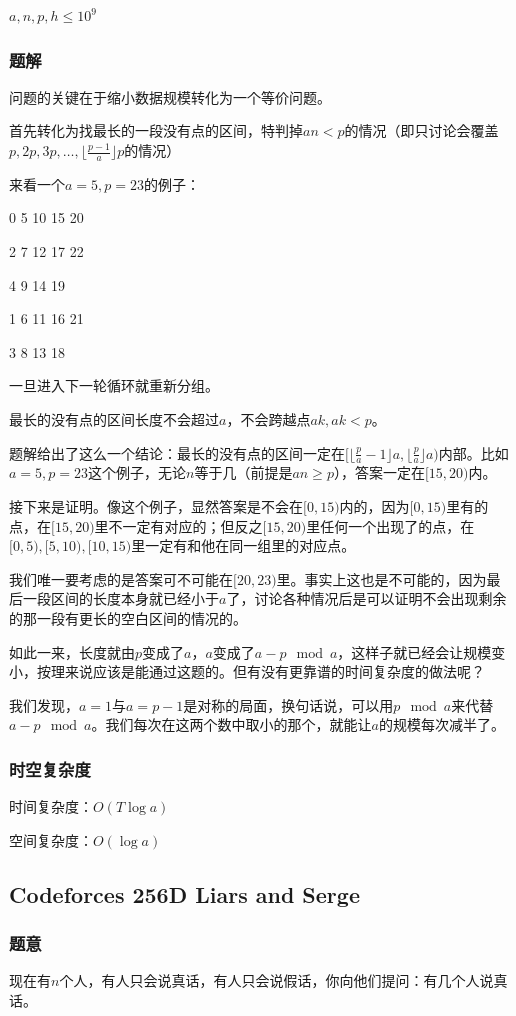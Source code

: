 \documentclass{ctexart}
\begin{document}
$a,n,p,h \le 10^9$
\subsubsection{题解}
问题的关键在于缩小数据规模转化为一个等价问题。

首先转化为找最长的一段没有点的区间，特判掉$an < p$的情况（即只讨论会覆盖$p,2p,3p,\ldots,\lfloor \frac{p-1}{a} \rfloor p$的情况）

来看一个$a=5,p=23$的例子：

0  5  10  15  20

2  7  12  17  22

4  9  14  19

1  6  11  16  21

3  8  13  18

一旦进入下一轮循环就重新分组。

最长的没有点的区间长度不会超过$a$，不会跨越点$ak,ak<p$。

题解给出了这么一个结论：最长的没有点的区间一定在$[\lfloor \frac{p}{a} -1 \rfloor a,\lfloor \frac{p}{a} \rfloor a)$内部。比如$a=5,p=23$这个例子，无论$n$等于几（前提是$an \ge p$），答案一定在$[15,20)$内。

接下来是证明。像这个例子，显然答案是不会在$[0,15)$内的，因为$[0,15)$里有的点，在$[15,20)$里不一定有对应的；但反之$[15,20)$里任何一个出现了的点，在$[0,5),[5,10),[10,15)$里一定有和他在同一组里的对应点。

我们唯一要考虑的是答案可不可能在$[20,23)$里。事实上这也是不可能的，因为最后一段区间的长度本身就已经小于$a$了，讨论各种情况后是可以证明不会出现剩余的那一段有更长的空白区间的情况的。

如此一来，长度就由$p$变成了$a$，$a$变成了$a- p \mod a$，这样子就已经会让规模变小，按理来说应该是能通过这题的。但有没有更靠谱的时间复杂度的做法呢？

我们发现，$a=1$与$a=p-1$是对称的局面，换句话说，可以用$p \mod a$来代替$a- p \mod a$。我们每次在这两个数中取小的那个，就能让$a$的规模每次减半了。
\subsubsection{时空复杂度}
时间复杂度：$O(T \log a)$

空间复杂度：$O(\log a)$
\subsection{Codeforces 256D Liars and Serge}
\subsubsection{题意}
现在有$n$个人，有人只会说真话，有人只会说假话，你向他们提问：有几个人说真话。
\end{document}
